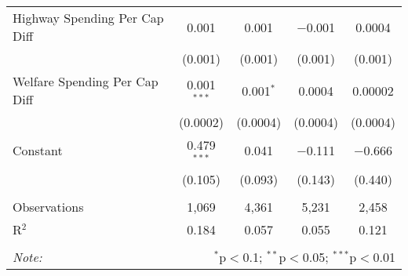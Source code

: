 \begin{table}[!htbp]
\begin{tabular}{@{\extracolsep{5pt}}lcccc}
  Highway Spending Per Cap Diff & 0.001 & 0.001 & $-$0.001 & 0.0004 \\ 
  & (0.001) & (0.001) & (0.001) & (0.001) \\ 
  Welfare Spending Per Cap Diff & 0.001$^{***}$ & 0.001$^{*}$ & 0.0004 & 0.00002 \\ 
  & (0.0002) & (0.0004) & (0.0004) & (0.0004) \\ 
  Constant & 0.479$^{***}$ & 0.041 & $-$0.111 & $-$0.666 \\ 
  & (0.105) & (0.093) & (0.143) & (0.440) \\ 
 \hline \\[-1.8ex] 
Observations & 1,069 & 4,361 & 5,231 & 2,458 \\ 
R$^{2}$ & 0.184 & 0.057 & 0.055 & 0.121 \\ 
\hline 
\hline \\[-1.8ex] 
\textit{Note:}  & \multicolumn{4}{r}{$^{*}$p$<$0.1; $^{**}$p$<$0.05; $^{***}$p$<$0.01} \\ 
\end{tabular} 
\end{table} 

